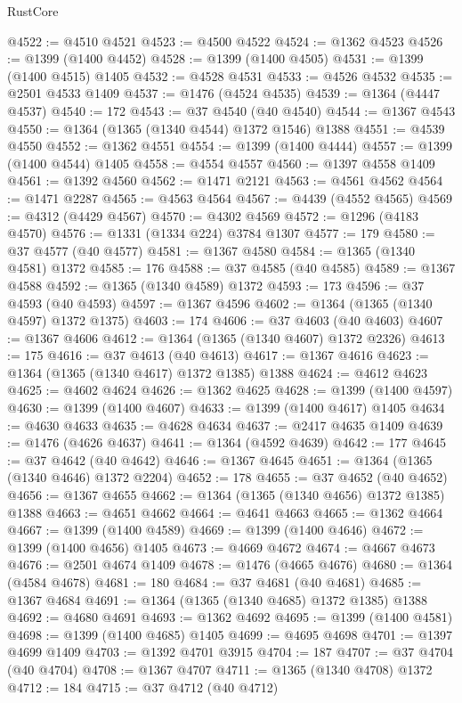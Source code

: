 \begin{lexlean}{RustCore}
\begin{coremodule}
@4522 := @4510 @4521
@4523 := @4500 @4522
@4524 := @1362 @4523
@4526 := @1399 (@1400 @4452)
@4528 := @1399 (@1400 @4505)
@4531 := @1399 (@1400 @4515) @1405
@4532 := @4528 @4531
@4533 := @4526 @4532
@4535 := @2501 @4533 @1409
@4537 := @1476 (@4524 @4535)
@4539 := @1364 (@4447 @4537)
@4540 := 172
@4543 := @37 @4540 (@40 @4540)
@4544 := @1367 @4543
@4550 := @1364 (@1365 (@1340 @4544) @1372 @1546) @1388
@4551 := @4539 @4550
@4552 := @1362 @4551
@4554 := @1399 (@1400 @4444)
@4557 := @1399 (@1400 @4544) @1405
@4558 := @4554 @4557
@4560 := @1397 @4558 @1409
@4561 := @1392 @4560
@4562 := @1471 @2121
@4563 := @4561 @4562
@4564 := @1471 @2287
@4565 := @4563 @4564
@4567 := @4439 (@4552 @4565)
@4569 := @4312 (@4429 @4567)
@4570 := @4302 @4569
@4572 := @1296 (@4183 @4570)
@4576 := @1331 (@1334 @224) @3784 @1307
@4577 := 179
@4580 := @37 @4577 (@40 @4577)
@4581 := @1367 @4580
@4584 := @1365 (@1340 @4581) @1372
@4585 := 176
@4588 := @37 @4585 (@40 @4585)
@4589 := @1367 @4588
@4592 := @1365 (@1340 @4589) @1372
@4593 := 173
@4596 := @37 @4593 (@40 @4593)
@4597 := @1367 @4596
@4602 := @1364 (@1365 (@1340 @4597) @1372 @1375)
@4603 := 174
@4606 := @37 @4603 (@40 @4603)
@4607 := @1367 @4606
@4612 := @1364 (@1365 (@1340 @4607) @1372 @2326)
@4613 := 175
@4616 := @37 @4613 (@40 @4613)
@4617 := @1367 @4616
@4623 := @1364 (@1365 (@1340 @4617) @1372 @1385) @1388
@4624 := @4612 @4623
@4625 := @4602 @4624
@4626 := @1362 @4625
@4628 := @1399 (@1400 @4597)
@4630 := @1399 (@1400 @4607)
@4633 := @1399 (@1400 @4617) @1405
@4634 := @4630 @4633
@4635 := @4628 @4634
@4637 := @2417 @4635 @1409
@4639 := @1476 (@4626 @4637)
@4641 := @1364 (@4592 @4639)
@4642 := 177
@4645 := @37 @4642 (@40 @4642)
@4646 := @1367 @4645
@4651 := @1364 (@1365 (@1340 @4646) @1372 @2204)
@4652 := 178
@4655 := @37 @4652 (@40 @4652)
@4656 := @1367 @4655
@4662 := @1364 (@1365 (@1340 @4656) @1372 @1385) @1388
@4663 := @4651 @4662
@4664 := @4641 @4663
@4665 := @1362 @4664
@4667 := @1399 (@1400 @4589)
@4669 := @1399 (@1400 @4646)
@4672 := @1399 (@1400 @4656) @1405
@4673 := @4669 @4672
@4674 := @4667 @4673
@4676 := @2501 @4674 @1409
@4678 := @1476 (@4665 @4676)
@4680 := @1364 (@4584 @4678)
@4681 := 180
@4684 := @37 @4681 (@40 @4681)
@4685 := @1367 @4684
@4691 := @1364 (@1365 (@1340 @4685) @1372 @1385) @1388
@4692 := @4680 @4691
@4693 := @1362 @4692
@4695 := @1399 (@1400 @4581)
@4698 := @1399 (@1400 @4685) @1405
@4699 := @4695 @4698
@4701 := @1397 @4699 @1409
@4703 := @1392 @4701 @3915
@4704 := 187
@4707 := @37 @4704 (@40 @4704)
@4708 := @1367 @4707
@4711 := @1365 (@1340 @4708) @1372
@4712 := 184
@4715 := @37 @4712 (@40 @4712)

\end{coremodule}
\end{lexlean}
